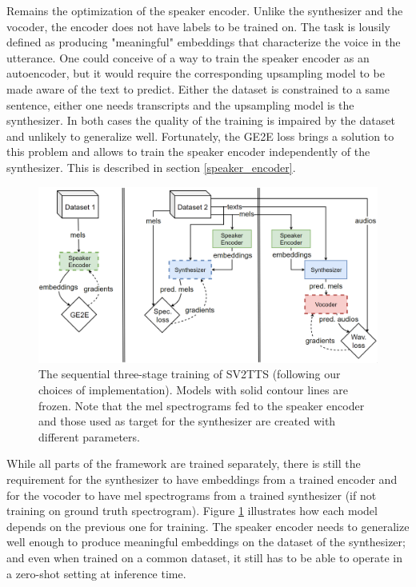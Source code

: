 \documentclass[a4paper, oneside, 12pt, english]{article}
\begin{document}
Remains the optimization of the speaker encoder. Unlike the synthesizer and the vocoder, the encoder does not have labels to be trained on. The task is lousily defined as producing "meaningful" embeddings that characterize the voice in the utterance. One could conceive of a way to train the speaker encoder as an autoencoder, but it would require the corresponding upsampling model to be made aware of the text to predict. Either the dataset is constrained to a same sentence, either one needs transcripts and the upsampling model is the synthesizer. In both cases the quality of the training is impaired by the dataset and unlikely to generalize well. Fortunately, the GE2E loss \citep{GE2E} brings a solution to this problem and allows to train the speaker encoder independently of the synthesizer. This is described in section \ref{speaker_encoder}. 

\begin{figure}[h]
	\centering
	\includegraphics[width=\linewidth]{images/sv2tts_training.png}
	\caption{The sequential three-stage training of SV2TTS (following our choices of implementation). Models with solid contour lines are frozen. Note that the mel spectrograms fed to the speaker encoder and those used as target for the synthesizer are created with different parameters.}
	\label{sv2tts_training}
\end{figure}

While all parts of the framework are trained separately, there is still the requirement for the synthesizer to have embeddings from a trained encoder and for the vocoder to have mel spectrograms from a trained synthesizer (if not training on ground truth spectrogram). Figure \ref{sv2tts_training} illustrates how each model depends on the previous one for training. The speaker encoder needs to generalize well enough to produce meaningful embeddings on the dataset of the synthesizer; and even when trained on a common dataset, it still has to be able to operate in a zero-shot setting at inference time. 
\end{document}
